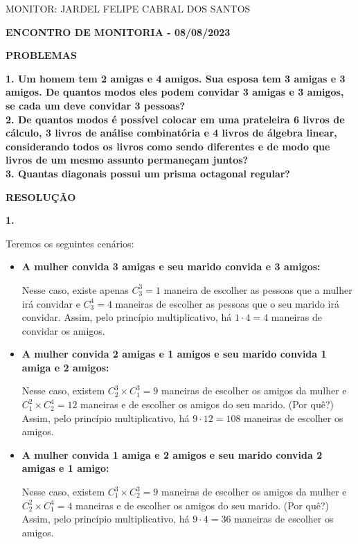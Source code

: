 \documentclass[12pt, a4paper]{article}
\begin{document}
\begin{flushleft}

MONITOR: JARDEL FELIPE CABRAL DOS SANTOS\\[1cm] 
\end{flushleft}

\begin{center} \textbf{ENCONTRO DE MONITORIA - 08/08/2023\\[1cm]}
\end{center}

\begin{center}
\textbf{PROBLEMAS}
\end{center}

\textbf{1. Um homem tem 2 amigas e 4 amigos. Sua esposa tem 3 amigas e 3 amigos. De quantos modos eles podem convidar 3 amigas e 3 amigos, se cada um deve convidar 3 pessoas?} \\

\textbf{2. De quantos modos é possível colocar em uma prateleira 6 livros de cálculo, 3 livros de análise combinatória e 4 livros de álgebra linear, considerando todos os livros como sendo diferentes e de modo que livros de um mesmo assunto permaneçam juntos?} \\

\textbf{3. Quantas diagonais possui um prisma octagonal regular?} \\

\begin{center}
\textbf{RESOLUÇÃO}
\end{center}

\textbf{1.}

Teremos os seguintes cenários: 
\begin{itemize}
\item \textbf{A mulher convida 3 amigas e seu marido convida e 3 amigos:}

Nesse caso, existe apenas \(C^3_3 = 1\) maneira de escolher as pessoas que a mulher irá convidar e \(C^4_3 = 4\) maneiras de escolher as pessoas que o seu marido irá convidar. Assim, pelo princípio multiplicativo, há \(1 \cdot{4} = 4\) maneiras de convidar os amigos.

\item \textbf{A mulher convida 2 amigas e 1 amigos e seu marido convida 1 amiga e 2 amigos:}

Nesse caso, existem \(C^3_2 \times C^3_1 = 9\) maneiras de escolher os amigos da mulher e \(C^2_1 \times C^4_2 = 12\) maneiras e de escolher os amigos do seu marido. (Por quê?) Assim, pelo princípio multiplicativo, há \(9 \cdot{12} = 108\) maneiras de escolher os amigos.

\item \textbf{A mulher convida 1 amiga e 2 amigos e seu marido convida 2 amigas e 1 amigo:}

Nesse caso, existem \(C^3_1 \times C^3_2 = 9\) maneiras de escolher os amigos da mulher e \(C^2_2 \times C^4_1 = 4\) maneiras e de escolher os amigos do seu marido. (Por quê?) Assim, pelo princípio multiplicativo, há \(9 \cdot{4} = 36\) maneiras de escolher os amigos.
\end{itemize}
\end{document}
